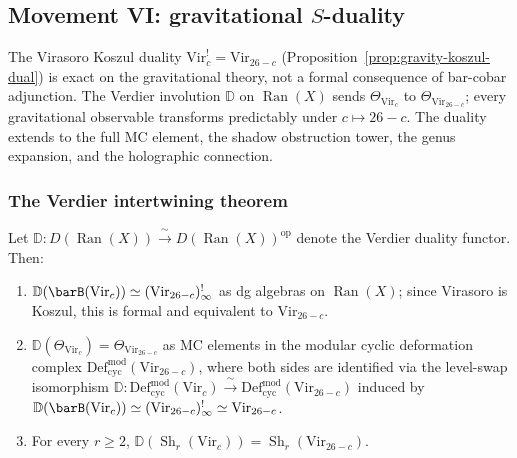 

\subsection{Movement VI: gravitational $S$-duality}
\label{subsec:gravity-s-duality}
\label{ch:thqg-3d-gravity-movements}%
\label{ch:thqg-3d-gravity-vi-x}%

The Virasoro Koszul duality $\mathrm{Vir}_c^! = \mathrm{Vir}_{26-c}$
(Proposition~\ref{prop:gravity-koszul-dual}) is exact on the
gravitational theory, not a formal consequence of bar-cobar
adjunction. The Verdier involution $\mathbb{D}$ on
$\operatorname{Ran}(X)$ sends $\Theta_{\mathrm{Vir}_c}$ to
$\Theta_{\mathrm{Vir}_{26-c}}$; every gravitational observable
transforms predictably under $c \mapsto 26 - c$. The duality
extends to the full MC element, the shadow obstruction tower,
the genus expansion, and the holographic connection.

\subsubsection*{The Verdier intertwining theorem}

\begin{theorem}
\label{thm:gravity-verdier-intertwining}
Let $\mathbb{D} \colon D(\operatorname{Ran}(X))
\xrightarrow{\;\sim\;} D(\operatorname{Ran}(X))^{\mathrm{op}}$
denote the Verdier duality functor. Then:
\begin{enumerate}[label=\textup{(\roman*)}]
\item $\mathbb{D}(\barB(\mathrm{Vir}_c))
 \simeq (\mathrm{Vir}_{26-c})^!_\infty$ as dg algebras on
 $\operatorname{Ran}(X)$; since Virasoro is Koszul,
 this is formal and equivalent to $\mathrm{Vir}_{26-c}$.
\item $\mathbb{D}(\Theta_{\mathrm{Vir}_c})
 = \Theta_{\mathrm{Vir}_{26-c}}$ as MC elements in the
 modular cyclic deformation complex
 $\mathrm{Def}_{\mathrm{cyc}}^{\mathrm{mod}}(\mathrm{Vir}_{26-c})$,
 where both sides are identified via the level-swap isomorphism
 $\mathbb{D} \colon
 \mathrm{Def}_{\mathrm{cyc}}^{\mathrm{mod}}(\mathrm{Vir}_c)
 \xrightarrow{\;\sim\;}
 \mathrm{Def}_{\mathrm{cyc}}^{\mathrm{mod}}(\mathrm{Vir}_{26-c})$
 induced by $\mathbb{D}(\barB(\mathrm{Vir}_c))
 \simeq (\mathrm{Vir}_{26-c})^!_\infty \simeq \mathrm{Vir}_{26-c}$.
\item For every $r \ge 2$,
 $\mathbb{D}(\operatorname{Sh}_r(\mathrm{Vir}_c))
 = \operatorname{Sh}_r(\mathrm{Vir}_{26-c})$.
\end{enumerate}
\end{theorem}

